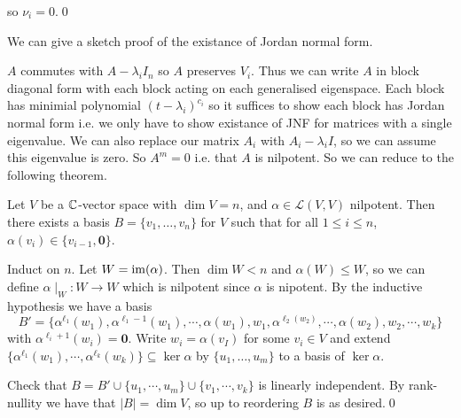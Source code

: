 \documentclass{article}
\begin{document}
so $ \nu_i=0 $.\qed
\par
We can give a sketch proof of the existance of Jordan normal form.\par
$ A $ commutes with $ A-\lambda_i I_n $ so $ A $ preserves $ V_i $. Thus we can write $ A $ in block diagonal form with each block acting on each generalised eigenspace. Each block has minimial polynomial $ (t-\lambda_i)^{c_i} $ so it suffices to show each block has Jordan normal form i.e. we only have to show existance of JNF for matrices with a single eigenvalue. We can also replace our matrix $ A_i $ with $ A_i-\lambda_i I $, so we can assume this eigenvalue is zero. So $ A^m=0 $ i.e. that $ A $ is nilpotent. So we can reduce to the following theorem.
\begin{theorem}
	Let $ V $ be a $ \mathbb{C} $-vector space with $ \dim V=n $, and $ \alpha\in\mathcal L(V,V) $ nilpotent. Then there exists a basis $ B = \{v_1,\dots, v_n\} $ for $ V $ such that for all $ 1\le i\le n $, $ \alpha(v_i)\in \{v_{i-1},\mathbf 0\} $.
\end{theorem}
\pf Induct on $ n $. Let $ W=\operatorname{im}(\alpha) $. Then $ \dim W<n $ and $ \alpha(W)\le W $, so we can define $ \alpha\mid_W:W\to W $ which is nilpotent since $ \alpha $ is nipotent. By the inductive hypothesis we have a basis
\[
	B'=\{\alpha^{\ell_1}(w_1),\alpha^{\ell_1-1}(w_1),\cdots, \alpha(w_1), w_1,\alpha^{\ell_2(w_2)},\cdots, \alpha(w_2),w_2,\cdots, w_k\}
\]
with $ \alpha^{\ell_i+1}(w_i)=\mathbf 0 $. Write $ w_i=\alpha(v_I) $ for some $ v_i\in V $ and extend $ \{\alpha^{\ell_1}(w_1),\cdots, \alpha^{\ell_k}(w_k)\} \subseteq \ker\alpha $ by $ \{u_1,\dots, u_m\} $ to a basis of $ \ker \alpha $.\par
Check that $ B=B'\cup \{u_1,\cdots, u_m\} \cup \{v_1,\cdots, v_k\} $ is linearly independent. By rank-nullity we have that $ |B|=\dim V $, so up to reordering $ B $ is as desired.\qed
\end{document}
